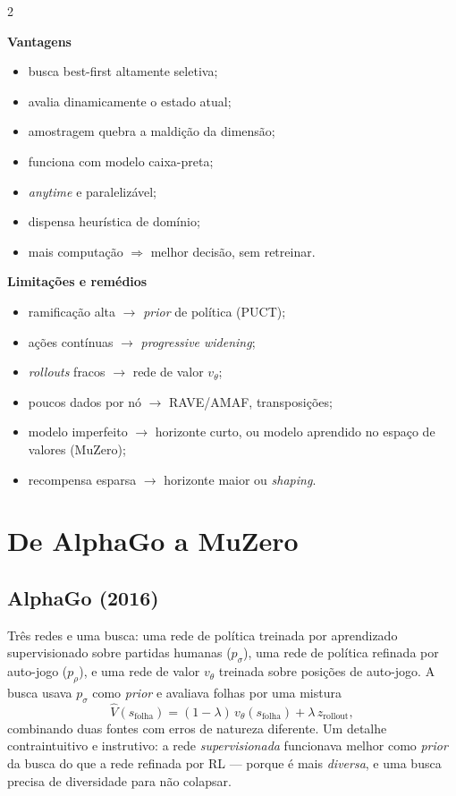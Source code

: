 \documentclass[a4paper, 11pt]{article}
\newcommand{\Vh}{\widehat{V}}
\newcommand{\folha}{s_{\mathrm{folha}}}
\begin{document}
\begin{multicols}{2}
{\small
\textbf{Vantagens}
\begin{itemize}
  \item busca best-first altamente seletiva;
  \item avalia dinamicamente o estado atual;
  \item amostragem quebra a maldição da dimensão;
  \item funciona com modelo caixa-preta;
  \item \emph{anytime} e paralelizável;
  \item dispensa heurística de domínio;
  \item mais computação $\Rightarrow$ melhor decisão, sem retreinar.
\end{itemize}

\columnbreak

\textbf{Limitações e remédios}
\begin{itemize}
  \item ramificação alta $\to$ \emph{prior} de política (PUCT);
  \item ações contínuas $\to$ \emph{progressive widening};
  \item \emph{rollouts} fracos $\to$ rede de valor $v_\theta$;
  \item poucos dados por nó $\to$ RAVE/AMAF, transposições;
  \item modelo imperfeito $\to$ horizonte curto, ou modelo aprendido no espaço
        de valores (MuZero);
  \item recompensa esparsa $\to$ horizonte maior ou \emph{shaping}.
\end{itemize}}
\end{multicols}

\section{De AlphaGo a MuZero}

\subsection{AlphaGo (2016)}

Três redes e uma busca: uma rede de política treinada por aprendizado
supervisionado sobre partidas humanas ($p_\sigma$), uma rede de política
refinada por auto-jogo ($p_\rho$), e uma rede de valor $v_\theta$ treinada sobre
posições de auto-jogo. A busca usava $p_\sigma$ como \emph{prior} e avaliava
folhas por uma mistura
\[
  \Vh(\folha) = (1-\lambda)\, v_\theta(\folha) + \lambda\, z_{\text{rollout}},
\]
combinando duas fontes com erros de natureza diferente. Um detalhe
contraintuitivo e instrutivo: a rede \emph{supervisionada} funcionava melhor
como \emph{prior} da busca do que a rede refinada por RL --- porque é mais
\emph{diversa}, e uma busca precisa de diversidade para não colapsar.
\end{document}
